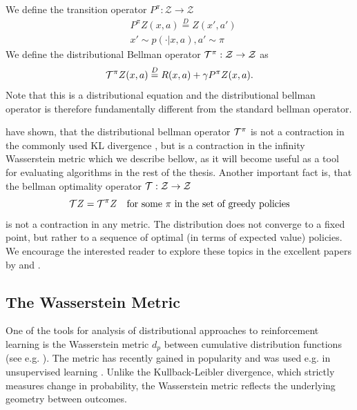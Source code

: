 We define the transition operator $P^\pi : \mathcal{Z} \to \mathcal{Z}$
\begin{equation}
\begin{split}
&P^\pi Z(x, a) \overset{D}{=} Z(x', a')\\
&x' \sim p(\cdot|x, a), a' \sim \pi
\end{split}
\end{equation}
We define the distributional Bellman operator $\mathcal{T}^\pi : \mathcal{Z} \to \mathcal{Z}$ as
\begin{equation}
\mathcal{T}^\pi Z(x,a) \overset{D}{=} R(x,a) + \gamma P^\pi Z(x,a).
\end{equation}
Note that this is a distributional equation and the distributional bellman operator is therefore fundamentally different from the standard bellman operator.

\citet{bellemare2017distributional} have shown, that the distributional bellman operator $\mathcal{T}^\pi$ is not a contraction in the commonly used KL divergence \cite{kullback1997information}, but is a contraction in the infinity Wasserstein metric which we describe bellow, as it will become useful as a tool for evaluating algorithms in the rest of the thesis. Another important fact is, that the bellman optimality operator $\mathcal{T} : \mathcal{Z}\to\mathcal{Z}$
\begin{equation}
\mathcal{T} Z = \mathcal{T}^\pi Z \quad \text{for some } \pi \text{ in the set of greedy policies}
\end{equation}
is not a contraction in any metric. The distribution does not converge to a fixed point, but rather to a sequence of optimal (in terms of expected value) policies. We encourage the interested reader to explore these topics in the excellent papers by \citet{bellemare2017distributional} and \citet{dabney2017distributional}.

\subsection{The Wasserstein Metric}
\newcommand{\pnorm}[1]{\| #1 \|_p}

One of the tools for analysis of distributional approaches to reinforcement learning is the Wasserstein metric $d_p$ between cumulative distribution functions (see e.g. \citet{bickel1981some}). The metric has recently gained in popularity and was used e.g. in unsupervised learning \citep{arjovsky2017wasserstein,bellemare2017cramer}. Unlike the Kullback-Leibler divergence, which strictly measures change in probability, the Wasserstein metric reflects the underlying geometry between outcomes.

